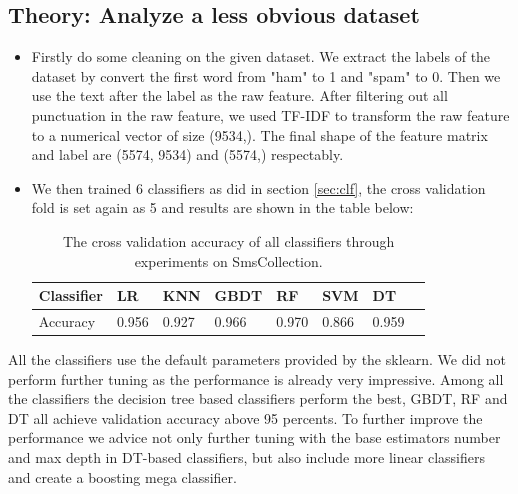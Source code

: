 \documentclass[runningheads]{llncs}
\begin{document}
\subsection{Theory: Analyze a less obvious dataset}
\begin{itemize}
    
    \item Firstly do some cleaning on the given dataset. We extract the labels of the dataset by convert the first word from "ham" to 1 and "spam" to 0. Then we use the text after the label as the raw feature. After filtering out all punctuation in the raw feature, we used TF-IDF to transform the raw feature to a numerical vector of size (9534,). The final shape of the feature matrix and label are (5574, 9534) and (5574,) respectably.
    \item We then trained 6 classifiers as did in section \ref{sec:clf}, the cross validation fold is set again as 5 and results are shown in the table below:
    \begin{table}[]
        \centering
        \caption{The cross validation accuracy of all classifiers through experiments on SmsCollection.}
        \begin{tabular}{|l|l|l|l|l|l|l|l|}
            \hline
            Classifier & LR    & KNN   & GBDT  & RF    & SVM     & DT    \\ \hline
            Accuracy & 0.956 & 0.927 & 0.966 & 0.970 & 0.866  & 0.959 \\ \hline
        \end{tabular}
        \label{fig:clf2}
    \end{table}
\end{itemize}
All the classifiers use the default parameters provided by the sklearn. We did not perform further tuning as the performance is already very impressive. Among all the classifiers the decision tree based classifiers perform the best, GBDT, RF and DT all achieve validation accuracy above 95 percents. To further improve the performance we advice not only further tuning with the base estimators number and max depth in DT-based classifiers, but also include more linear classifiers and create a boosting mega classifier.




\end{document}
